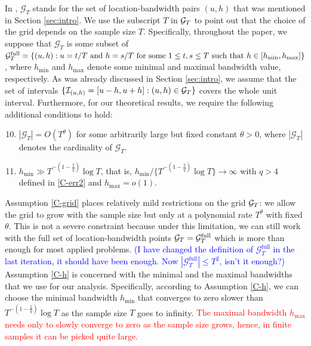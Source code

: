 \documentclass[a4paper,12pt]{article}
\makeatletter
\renewcommand{\eqref}[1]{\tagform@{\ref{#1}}}
\makeatother
\begin{document}
In \eqref{eq:Psi_hat}, $\mathcal{G}_T$ stands for the set of location-bandwidth pairs $(u, h)$ that was mentioned in Section \ref{sec:intro}. We use the subscript $T$ in $\mathcal{G}_T$ to point out that the choice of the grid depends on the sample size $T$. Specifically, throughout the paper, we suppose that $\mathcal{G}_T$ is some subset of $\mathcal{G}_T^{\text{full}} = \{ (u,h): u = t/T \text{ and } h = s/T \text{ for some } 1 \le t, s \le T \text{ such that } \linebreak h \in [h_{\min},h_{\max}] \}$, where $h_{\min}$ and $h_{\max}$ denote some minimal and maximal bandwidth value, respectively. As was already discussed in Section \ref{sec:intro}, we assume that the set of intervals $\{\mathcal{I}_{(u, h)} = [u-h, u+h]: (u, h) \in \mathcal{G}_T\}$ covers the whole unit interval. Furthermore, for our theoretical results, we require the following additional conditions to hold:
\begin{enumerate}[label=(C\arabic*),leftmargin=1.05cm]
\setcounter{enumi}{9}

\item \label{C-grid} $|\mathcal{G}_T| = O(T^\theta)$ for some arbitrarily large but fixed constant $\theta > 0$, where $|\mathcal{G}_T|$ denotes the cardinality of $\mathcal{G}_T$. 

\item \label{C-h} $h_{\min} \gg T^{-(1-\frac{2}{q})} \log T$, that is, $h_{\min} / \{ T^{-(1-\frac{2}{q})} \log T \} \rightarrow \infty$ with $q > 4$ defined in \ref{C-err2} and $h_{\max} = o(1)$.

\end{enumerate}
Assumption \ref{C-grid} places relatively mild restrictions on the grid $\mathcal{G}_T$: we allow the grid to grow with the sample size but only at a polynomial rate $T^\theta$ with fixed $\theta$. This is not a severe constraint because under this limitation, we can still work with the full set of location-bandwidth points $\mathcal{G}_T = \mathcal{G}_T^{\text{full}}$ which is more than enough for most applied problems. \textcolor{blue}{(I have changed the definition of $\mathcal{G}_T^{\text{full}}$ in the last iteration, it should have been enough. Now $|\mathcal{G}_T^{\text{full}}| \leq T^2$, isn't it enough?)} Assumption \ref{C-h} is concerned with the minimal and the maximal bandwidths that we use for our analysis. Specifically, according to Assumption \ref{C-h}, we can choose the minimal bandwidth $h_{\min}$ that converges to zero slower than $T^{-(1-\frac{2}{q})} \log T$ as the sample size $T$ goes to infinity. \textcolor{red}{The maximal bandwidth $h_{\max}$ needs only to slowly converge to zero as the sample size grows, hence, in finite samples it can be picked quite large.}
\end{document}
